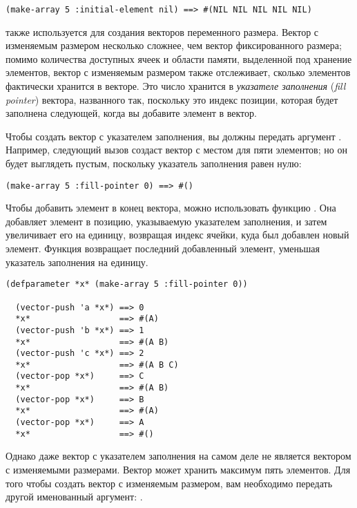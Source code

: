 \begin{lstlisting}[style=lisprepl]
  (make-array 5 :initial-element nil) ==> #(NIL NIL NIL NIL NIL)
\end{lstlisting}

 также используется для создания векторов переменного размера.
Вектор с изменяемым размером несколько сложнее, чем вектор фиксированного размера;
помимо количества доступных ячеек и области памяти, выделенной под хранение элементов,
вектор с изменяемым размером также отслеживает, сколько элементов фактически
хранится в векторе.  Это число хранится в \textit{указателе заполнения} (\textit{fill pointer})
вектора, названного так, поскольку это индекс позиции, которая будет заполнена следующей,
когда вы добавите элемент в вектор.

Чтобы создать вектор с указателем заполнения, вы должны передать 
аргумент .  Например, следующий вызов  создаст вектор
с местом для пяти элементов; но он будет выглядеть пустым, поскольку указатель заполнения
равен нулю:

\begin{lstlisting}[style=lisprepl]
  (make-array 5 :fill-pointer 0) ==> #()
\end{lstlisting}

Чтобы добавить элемент в конец вектора, можно использовать функцию
.  Она добавляет элемент в позицию, указываемую указателем заполнения, и
затем увеличивает его на единицу, возвращая индекс ячейки, куда был добавлен новый
элемент.  Функция  возвращает последний добавленный элемент, уменьшая
указатель заполнения на единицу.

\begin{lstlisting}[style=lisprepl]
  (defparameter *x* (make-array 5 :fill-pointer 0))
  
  (vector-push 'a *x*) ==> 0
  *x*                  ==> #(A)
  (vector-push 'b *x*) ==> 1
  *x*                  ==> #(A B)
  (vector-push 'c *x*) ==> 2
  *x*                  ==> #(A B C)
  (vector-pop *x*)     ==> C
  *x*                  ==> #(A B)
  (vector-pop *x*)     ==> B
  *x*                  ==> #(A)
  (vector-pop *x*)     ==> A
  *x*                  ==> #()
\end{lstlisting}

Однако даже вектор с указателем заполнения на самом деле не является вектором с изменяемыми
размерами.  Вектор  может хранить максимум пять элементов.  Для того чтобы
создать вектор с изменяемым размером, вам необходимо передать  другой
именованный аргумент: .

